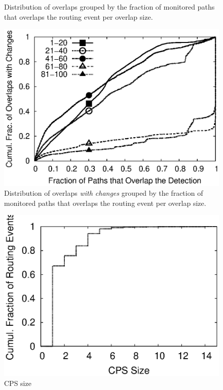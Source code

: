 \begin{figure}
\begin{minipage}{0.32\textwidth}
\caption{Distribution of overlaps grouped by the fraction of monitored paths
that overlaps the routing event per overlap size.}
\label{fig:zones.overlap.detection}
\end{minipage}
%
\hfill
\begin{minipage}{0.32\textwidth}
\includegraphics[width=1.05\columnwidth]{figs/patching/probchangezones/zones_changes_per_intersect.eps}
\caption{Distribution of overlaps \emph{with changes} grouped by the fraction
of monitored paths that overlaps the routing event per overlap size.}
\label{fig:zones.changes.detection}
\end{minipage}
\end{figure}




\begin{figure}
\begin{center}
\includegraphics[width=1.05\columnwidth]{figs/patching/cpssize/cpssize.eps}
\caption{CPS size}
\label{fig:cps.size}
\end{center}
\end{figure}


